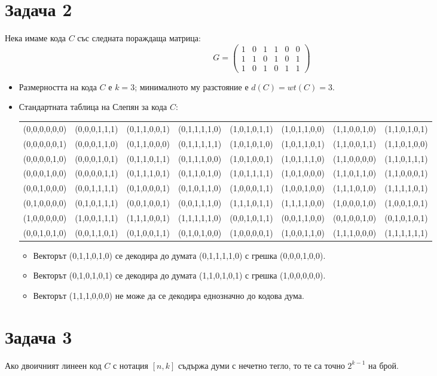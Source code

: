 \documentclass[a4paper,notitlepage,oneside]{report}
\begin{document}
\section{Задача 2}
Нека имаме кода $C$ със следната пораждаща матрица:
\[
G = 
\begin{pmatrix}
  1 & 0 & 1 & 1 & 0 & 0\\
  1 & 1 & 0 & 1 & 0 & 1\\
  1 & 0 & 1 & 0 & 1 & 1
\end{pmatrix}
\]
\begin{itemize}
  \item Размерността на кода $C$ е $k=3$; минималното му разстояние е $d(C)=wt(C) = 3$.
  \item Стандартната таблица на Слепян за кода $C$:
    \begin{table}[h]
      \begin{tabular}{ | c | c c c c c c c |}
        \hline
          (0,0,0,0,0,0) & (0,0,0,1,1,1) & (0,1,1,0,0,1) & (0,1,1,1,1,0) & (1,0,1,0,1,1) & (1,0,1,1,0,0) & (1,1,0,0,1,0) & (1,1,0,1,0,1)\\ 
          (0,0,0,0,0,1) & (0,0,0,1,1,0) & (0,1,1,0,0,0) & (0,1,1,1,1,1) & (1,0,1,0,1,0) & (1,0,1,1,0,1) & (1,1,0,0,1,1) & (1,1,0,1,0,0)\\
          (0,0,0,0,1,0) & (0,0,0,1,0,1) & (0,1,1,0,1,1) & (0,1,1,1,0,0) & (1,0,1,0,0,1) & (1,0,1,1,1,0) & (1,1,0,0,0,0) & (1,1,0,1,1,1)\\
          (0,0,0,1,0,0) & (0,0,0,0,1,1) & (0,1,1,1,0,1) & (0,1,1,0,1,0) & (1,0,1,1,1,1) & (1,0,1,0,0,0) & (1,1,0,1,1,0) & (1,1,0,0,0,1)\\
          (0,0,1,0,0,0) & (0,0,1,1,1,1) & (0,1,0,0,0,1) & (0,1,0,1,1,0) & (1,0,0,0,1,1) & (1,0,0,1,0,0) & (1,1,1,0,1,0) & (1,1,1,1,0,1)\\
          (0,1,0,0,0,0) & (0,1,0,1,1,1) & (0,0,1,0,0,1) & (0,0,1,1,1,0) & (1,1,1,0,1,1) & (1,1,1,1,0,0) & (1,0,0,0,1,0) & (1,0,0,1,0,1)\\
          (1,0,0,0,0,0) & (1,0,0,1,1,1) & (1,1,1,0,0,1) & (1,1,1,1,1,0) & (0,0,1,0,1,1) & (0,0,1,1,0,0) & (0,1,0,0,1,0) & (0,1,0,1,0,1)\\ \hline
          (0,0,1,0,1,0) & (0,0,1,1,0,1) & (0,1,0,0,1,1) & (0,1,0,1,0,0) & (1,0,0,0,0,1) & (1,0,0,1,1,0) & (1,1,1,0,0,0) & (1,1,1,1,1,1)\\ \hline
      \end{tabular}
    \end{table}
    
    \begin{itemize}
    \item Векторът (0,1,1,0,1,0) се декодира до думата (0,1,1,1,1,0) с грешка
      (0,0,0,1,0,0).
    \item Векторът (0,1,0,1,0,1) се декодира до думата (1,1,0,1,0,1) с грешка
      (1,0,0,0,0,0).
    \item Векторът (1,1,1,0,0,0) не може да се декодира еднозначно до кодова
      дума.
    \end{itemize}
\end{itemize}

\section{Задача 3}
Ако двоичният линеен код $C$ с нотация $[n, k]$ съдържа думи с нечетно тегло, то
те са точно $2^{k-1}$ на брой.
\end{document}
